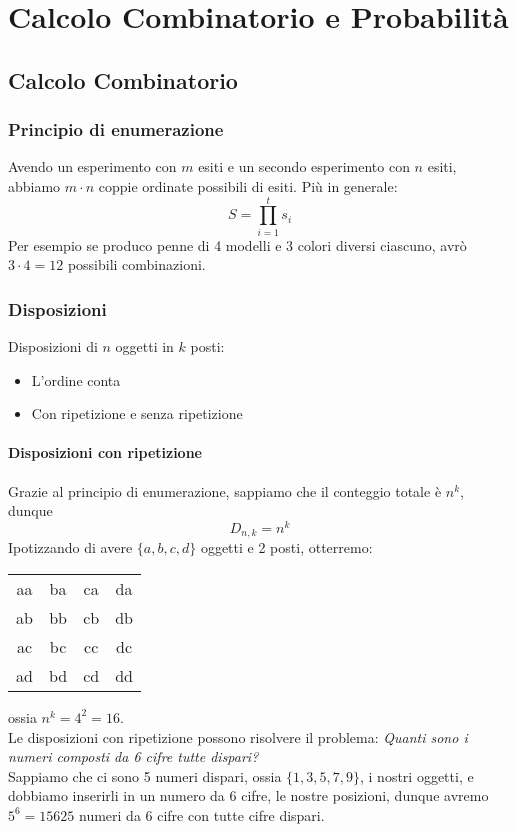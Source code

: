 \documentclass[11pt]{report}
\begin{document}
\part{Calcolo Combinatorio e Probabilità}

\chapter{Calcolo Combinatorio}

\section{Principio di enumerazione}
Avendo un esperimento con $m$ esiti e un secondo esperimento con $n$ esiti, abbiamo $m \cdot n$ coppie ordinate possibili di esiti. Più in generale:
\begin{equation}
    S = \prod_{i=1}^{t}s_i
\end{equation}
Per esempio se produco penne di 4 modelli e 3 colori diversi ciascuno, avrò $3 \cdot 4 = 12$ possibili combinazioni.

\section{Disposizioni}
Disposizioni di $n$ oggetti in $k$ posti:
\begin{itemize}
	\item L'ordine conta
	\item Con ripetizione e senza ripetizione
\end{itemize}
\subsection{Disposizioni con ripetizione}
Grazie al principio di enumerazione, sappiamo che il conteggio totale è $n^k$, dunque
\begin{equation}
    D_{n,k} = n^k
\end{equation}
Ipotizzando di avere $\{a,b,c,d\}$ oggetti e 2 posti, otterremo:
\begin{center}
\begin{tabular}{ c c c c }
aa & ba & ca & da \\
ab & bb & cb & db \\
ac & bc & cc & dc \\
ad & bd & cd & dd \\
\end{tabular}
\end{center}
ossia $n^k = 4^2 = 16$.\\
Le disposizioni con ripetizione possono risolvere il problema: \textit{Quanti sono i numeri composti da 6 cifre tutte dispari?}\\
Sappiamo che ci sono 5 numeri dispari, ossia $\{1,3,5,7,9\}$, i nostri oggetti, e dobbiamo inserirli in un numero da 6 cifre, le nostre posizioni, dunque avremo $5^6 = 15625$ numeri da 6 cifre con tutte cifre dispari.
\end{document}
